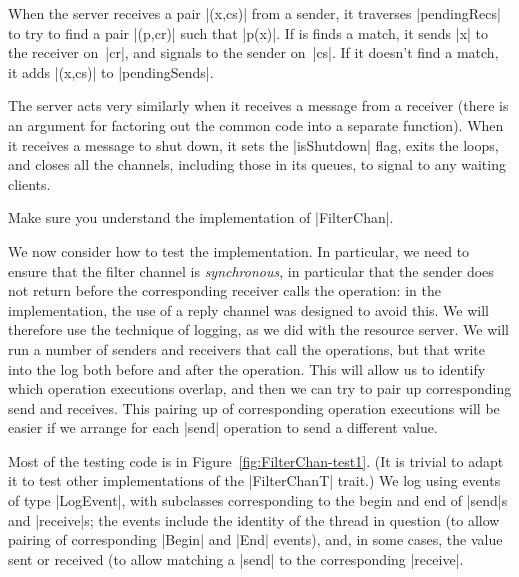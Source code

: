 When the server receives a pair |(x,cs)| from a sender, it traverses
|pendingRecs| to try to find a pair |(p,cr)| such that |p(x)|.  If is finds a
match, it sends |x| to the receiver on~|cr|, and signals to the sender
on~|cs|.  If it doesn't find a match, it adds |(x,cs)| to |pendingSends|.

The server acts very similarly when it receives a message from a receiver
(there is an argument for factoring out the common code into a separate
function).  When it receives a message to shut down, it sets the |isShutdown|
flag, exits the loops, and closes all the channels, including those in its
queues, to signal to any waiting clients.

\begin{instruction}
Make sure you understand the implementation of |FilterChan|.
\end{instruction}


We now consider how to test the implementation.  In particular, we need to
ensure that the filter channel is \emph{synchronous}, in particular that the
sender does not return before the corresponding receiver calls the operation:
in the implementation, the use of a reply channel was designed to avoid this.
We will therefore use the technique of logging, as we did with the resource
server.  We will run a number of senders and receivers that call the
operations, but that write into the log both before and after the operation.
This will allow us to identify which operation executions overlap, and then we
can try to pair up corresponding send and receives.  
%
This pairing up of corresponding operation executions will be easier if we
arrange for each |send| operation to send a different value.  

Most of the testing code is in Figure~\ref{fig:FilterChan-test1}.  (It is
trivial to adapt it to test other implementations of the |FilterChanT| trait.)
We log using events of type |LogEvent|, with subclasses corresponding to the
begin and end of |send|s and |receive|s; the events include the identity of
the thread in question (to allow pairing of corresponding |Begin| and |End|
events), and, in some cases, the value sent or received (to allow matching a
|send| to the corresponding |receive|.


